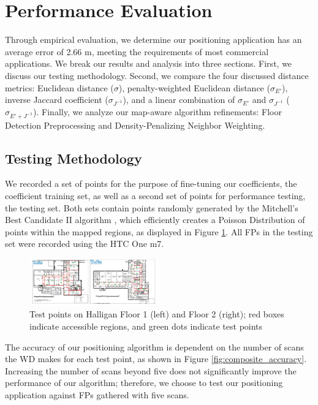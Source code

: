 \documentclass[conference]{IEEEtran}
\begin{document}
\section{Performance Evaluation}

Through empirical evaluation, we determine our positioning application has an average error of 2.66 m, meeting the requirements of most commercial applications. We break our results and analysis into three sections. First, we discuss our testing methodology. Second, we compare the four discussed distance metrics: Euclidean distance ($\sigma$), penalty-weighted Euclidean distance ($\sigma_{E'}$), inverse Jaccard coefficient ($\sigma_{J^{-1}}$), and a linear combination of $\sigma_{E'}$ and $\sigma_{J^{-1}}$ ($\sigma_{E' + J^{-1}}$). Finally, we analyze our map-aware algorithm refinements: Floor Detection Preprocessing and Density-Penalizing Neighbor Weighting.

\subsection{Testing Methodology}
We recorded a set of points for the purpose of fine-tuning our coefficients, the coefficient training set, as well as a second set of points for performance testing, the testing set. Both sets contain points randomly generated by the Mitchell's Best Candidate II algorithm \cite{Machaj}, which efficiently creates a Poisson Distribution of points within the mapped regions, as displayed in Figure \ref{fig:test_points}. All FPs in the testing set were recorded using the HTC One m7. 

\begin{figure}[t!]
  \centering
    \includegraphics[width=0.5\textwidth]{testpoints}
   \caption{Test points on Halligan Floor 1 (left) and Floor 2 (right); red boxes indicate accessible regions, and green dots indicate test points}
   \label{fig:test_points}
\end{figure}

The accuracy of our positioning algorithm is dependent on the number of scans the WD makes for each test point, as shown in Figure \ref{fig:composite_accuracy}. Increasing the number of scans beyond five does not significantly improve the performance of our algorithm; therefore, we choose to test our positioning application against FPs gathered with five scans.
\end{document}
